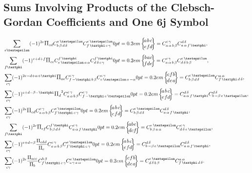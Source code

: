 \subsection{Sums Involving Products of the Clebsch-Gordan Coefficients and One 6j Symbol}\label{sec:8.7.5}
\begin{align}
& \sum_{e \varepsilon}(-1)^{2 e} \Fact{c d} \clebsch{b}{\beta}{d}{\delta}{e}{\varepsilon} \clebsch{f}{\varphi}{c}{\gamma}{e}{\varepsilon}
\sixj{a}{b}{c}{e}{f}{d}
=\clebsch{a}{\alpha}{b}{\beta}{c}{\gamma} 
\clebsch{a}{\alpha}{f}{\varphi}{d}{\delta}, \label{eq:8:7:31}\\
& \sum_{f \varphi}(-1)^{c+d+f} \Fact{c e} \clebsch{e}{\varepsilon}{a}{\alpha}{f}{\varphi} \clebsch{d}{\delta}{c}{\gamma}{f}{\varphi}\sixj{b}{a}{c}{f}{d}{e}=\clebsch{a}{\alpha}{b}{\beta}{c}{\gamma} \clebsch{d}{\delta}{b}{\beta}{e}{\varepsilon}, \label{eq:8:7:32}\\
& \sum_{c \gamma}(-1)^{2 e-d+\alpha+\varphi} \Fact{a e} \clebsch{f}{-\varphi}{b}{\beta}{c}{\gamma} \clebsch{e}{\varepsilon}{a}{-\alpha}{c}{\gamma}\sixj{c}{f}{b}{d}{e}{a}=\clebsch{b}{\beta}{d}{\delta}{e}{\varepsilon} \clebsch{f}{\varphi}{d}{\delta}{a}{\alpha}, \label{eq:8:7:33}\\
& \sum_{c \gamma}(-1)^{c+d-\beta-\varphi} \Fact{d}^{2} \clebsch{a}{\alpha}{b}{\beta}{c}{\gamma} \clebsch{f}{-\varphi}{e}{\varepsilon}{c}{\gamma}\sixj{a}{b}{c}{e}{f}{d}=\clebsch{a}{\alpha}{f}{\varphi}{d}{\delta} \clebsch{b}{-\beta}{e}{\varepsilon}{d}{\delta}, \label{eq:8:7:34}\\
& \sum_{c \gamma}(-1)^{2 e} \Fact{c d} \clebsch{a}{\alpha}{b}{\beta}{c}{\gamma} \clebsch{f}{\varphi}{c}{\gamma}{e}{\varepsilon}\sixj{a}{b}{c}{e}{f}{d}=\clebsch{b}{\beta}{d}{\delta}{e}{\varepsilon} \clebsch{a}{\alpha}{f}{\varphi}{d}{\delta}, \label{eq:8:7:35}\\
& \sum_{f \varphi}(-1)^{2 c} \Fact{e f} \clebsch{b}{\beta}{d}{\delta}{f}{\varphi} \clebsch{a}{\alpha}{f}{\varphi}{c}{\gamma}\sixj{a}{b}{e}{d}{c}{f}=\clebsch{b}{\beta}{a}{\alpha}{e}{\varepsilon} \clebsch{d}{\delta}{e}{\varepsilon}{c}{\gamma}, \label{eq:8:7:36}\\
& \sum_{c \gamma}(-1)^{e+d-\beta} \frac{\Fact{c\dd d}}{\Fact{e}} \clebsch{a}{\alpha}{b}{\beta}{c}{\gamma} \clebsch{f}{\varphi}{c}{\gamma}{e}{\varepsilon}\sixj{a}{b}{c}{e}{f}{d}=\clebsch{b}{-\beta}{e}{\varepsilon}{d}{\delta} \clebsch{a}{\alpha}{f}{\varphi}{d}{\delta}, \label{eq:8:7:37}\\
& \sum_{c \gamma}(-1)^{2 e} \frac{\Fact{a c c}}{\Fact{b}} \clebsch{f}{\varphi}{c}{\gamma}{b}{\beta} \clebsch{c}{\gamma}{a}{\alpha}{e}{\varepsilon}\sixj{c}{f}{b}{d}{e}{a}=\clebsch{d}{\delta}{b}{\beta}{e}{\varepsilon} \clebsch{f}{\varphi}{d}{\delta}{a}{\alpha} . \label{eq:8:7:38}
\end{align}
